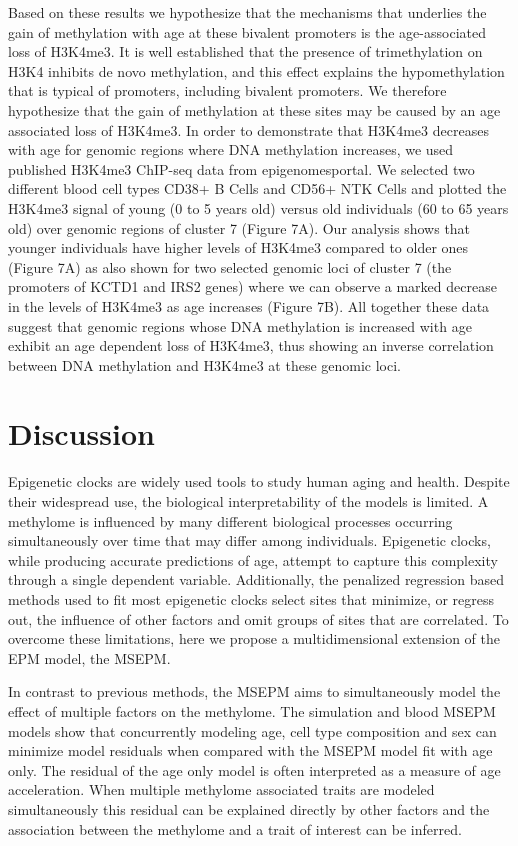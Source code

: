 \documentclass{article}
\begin{document}
{\begin{linenumbers}
Based on these results we hypothesize that the mechanisms that underlies the gain of methylation with age at these 
bivalent promoters is the age-associated loss of H3K4me3.  It is well established that the presence of trimethylation
 on H3K4 inhibits de novo methylation, and this effect explains the hypomethylation that is typical of promoters, 
 including bivalent promoters.  We therefore hypothesize that the gain of methylation at these sites may be caused 
 by an age associated loss of H3K4me3.  In order to demonstrate that H3K4me3 decreases with age for genomic regions 
 where DNA methylation increases, we used published H3K4me3 ChIP-seq data from epigenomesportal\cite{Bujold2016-vk}. 
 We selected two different blood cell types CD38+ B Cells and CD56+ NTK Cells and plotted the H3K4me3 signal of young 
 (0 to 5 years old) versus old individuals (60 to 65 years old) over genomic regions of cluster 7 (Figure 7A). 
 Our analysis shows that younger individuals have higher levels of H3K4me3 compared to older ones (Figure 7A) as 
 also shown for two selected genomic loci of cluster 7 (the promoters of KCTD1 and IRS2 genes) where we can observe
 a marked decrease in the levels of H3K4me3 as age increases (Figure 7B). All together these data suggest that genomic 
 regions whose DNA methylation is increased with age exhibit an age dependent loss of H3K4me3, thus showing an inverse 
 correlation between DNA methylation and H3K4me3 at these genomic loci. 

\section{Discussion}\label{sec4}

Epigenetic clocks are widely used tools to study human aging and health. Despite their widespread use, 
the biological interpretability of the models is limited. A methylome is influenced by many different biological 
processes occurring simultaneously over time that may differ among individuals. Epigenetic clocks, while producing
 accurate predictions of age, attempt to capture this complexity through a single dependent variable. Additionally,
  the penalized regression based methods used to fit most epigenetic clocks select sites that minimize, or regress out,
   the influence of other factors and omit groups of sites that are correlated. To overcome these limitations, here 
   we propose a multidimensional extension of the EPM model, the MSEPM. 

In contrast to previous methods, the MSEPM aims to simultaneously model the effect of multiple factors on the methylome.
The simulation and blood MSEPM models show that concurrently modeling age, cell type composition and sex can minimize  
model residuals when compared with the MSEPM model fit with age only. The residual of the age only model is often 
interpreted as a measure of age acceleration. When multiple methylome associated traits are modeled simultaneously 
this residual can be explained directly by other factors and the association between the methylome and a trait of 
interest can be inferred. 


\end{linenumbers}}
\end{document}
